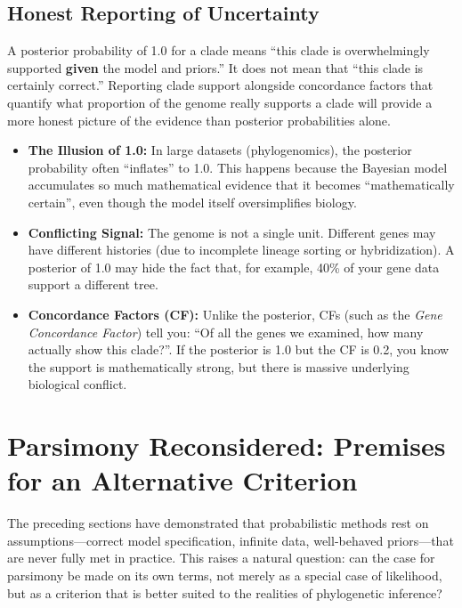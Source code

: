 \subsection{Honest Reporting of Uncertainty}

A posterior probability of 1.0 for a clade means ``this clade is overwhelmingly supported \textbf{given} the model and priors.'' It does not mean that ``this clade is certainly correct.'' Reporting clade support alongside concordance factors that quantify what proportion of the genome really supports a clade will provide a more honest picture of the evidence than posterior probabilities alone.

\begin{tcolorbox}[
    colback=green!5!white,
    colframe=green!50!black,
    title=\textbf{Posterior 1.0 vs. Biological Reality},
    arc=2mm
]
\begin{itemize}
    \item \textbf{The Illusion of 1.0:} In large datasets (phylogenomics), the posterior probability often ``inflates'' to 1.0. This happens because the Bayesian model accumulates so much mathematical evidence that it becomes ``mathematically certain'', even though the model itself oversimplifies biology.
    \item \textbf{Conflicting Signal:} The genome is not a single unit. Different genes may have different histories (due to incomplete lineage sorting or hybridization). A posterior of 1.0 may hide the fact that, for example, 40\% of your gene data support a different tree.
    \item \textbf{Concordance Factors (CF):} Unlike the posterior, CFs (such as the \textit{Gene Concordance Factor}) tell you: ``Of all the genes we examined, how many actually show this clade?''. If the posterior is 1.0 but the CF is 0.2, you know the support is mathematically strong, but there is massive underlying biological conflict.
\end{itemize}
\end{tcolorbox}

\section{Parsimony Reconsidered: Premises for an Alternative Criterion}

The preceding sections have demonstrated that probabilistic methods rest on assumptions---correct model specification, infinite data, well-behaved priors---that are never fully met in practice. This raises a natural question: can the case for parsimony be made on its own terms, not merely as a special case of likelihood, but as a criterion that is better suited to the realities of phylogenetic inference?

